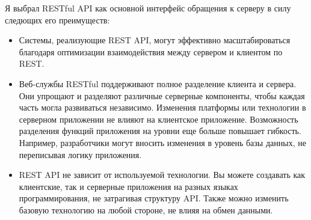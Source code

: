 Я выбрал RESTful API как основной интерфейс обращения к серверу в силу следющих его преимуществ: 

\begin{itemize}
	\item Системы, реализующие REST API, могут эффективно масштабироваться благодаря оптимизации взаимодействия между сервером и клиентом по REST.
	\item Веб-службы RESTful поддерживают полное разделение клиента и сервера. Они упрощают и разделяют различные серверные компоненты, чтобы каждая часть могла развиваться независимо. Изменения платформы или технологии в серверном приложении не влияют на клиентское приложение. Возможность разделения функций приложения на уровни еще больше повышает гибкость. Например, разработчики могут вносить изменения в уровень базы данных, не переписывая логику приложения.
	\item REST API не зависит от используемой технологии. Вы можете создавать как клиентские, так и серверные приложения на разных языках программирования, не затрагивая структуру API. Также можно изменить базовую технологию на любой стороне, не влияя на обмен данными.
\end{itemize}


%


%
%




